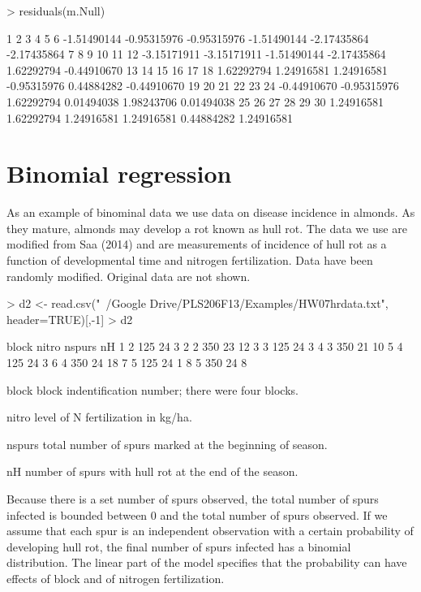 \documentclass{article}
\begin{document}
\begin{Schunk}
\begin{Sinput}
> residuals(m.Null)
\end{Sinput}
\begin{Soutput}
          1           2           3           4           5           6 
-1.51490144 -0.95315976 -0.95315976 -1.51490144 -2.17435864 -2.17435864 
          7           8           9          10          11          12 
-3.15171911 -3.15171911 -1.51490144 -2.17435864  1.62292794 -0.44910670 
         13          14          15          16          17          18 
 1.62292794  1.24916581  1.24916581 -0.95315976  0.44884282 -0.44910670 
         19          20          21          22          23          24 
-0.44910670 -0.95315976  1.62292794  0.01494038  1.98243706  0.01494038 
         25          26          27          28          29          30 
 1.24916581  1.62292794  1.24916581  1.24916581  0.44884282  1.24916581 
\end{Soutput}
\end{Schunk}

\section{Binomial regression}

As an example of binominal data we use data on disease incidence in almonds. As they mature, almonds may develop a rot known as hull rot. The data we use are modified from Saa (2014) and are measurements of incidence of hull rot as a function of developmental time and nitrogen fertilization. Data have been randomly modified. Original data are not shown.

\begin{Schunk}
\begin{Sinput}
> d2 <- read.csv("~/Google Drive/PLS206F13/Examples/HW07hrdata.txt", header=TRUE)[,-1]
> d2
\end{Sinput}
\begin{Soutput}
  block nitro nspurs nH
1     2   125     24  3
2     2   350     23 12
3     3   125     24  3
4     3   350     21 10
5     4   125     24  3
6     4   350     24 18
7     5   125     24  1
8     5   350     24  8
\end{Soutput}
\end{Schunk}

\begin{description*}
  \item[block] block indentification number; there were four blocks.
  \item[nitro] level of N fertilization in kg/ha.
  \item[nspurs] total number of spurs marked at the beginning of season.
  \item[nH] number of spurs with hull rot at the end of the season.
\end{description*}

Because there is a set number of spurs observed, the total number of spurs infected is bounded between 0 and the total number of spurs observed. If we assume that each spur is an independent observation with a certain probability of developing hull rot, the final number of spurs infected has a binomial distribution. The linear part of the model specifies that the probability can have effects of block and of nitrogen fertilization.
\end{document}
